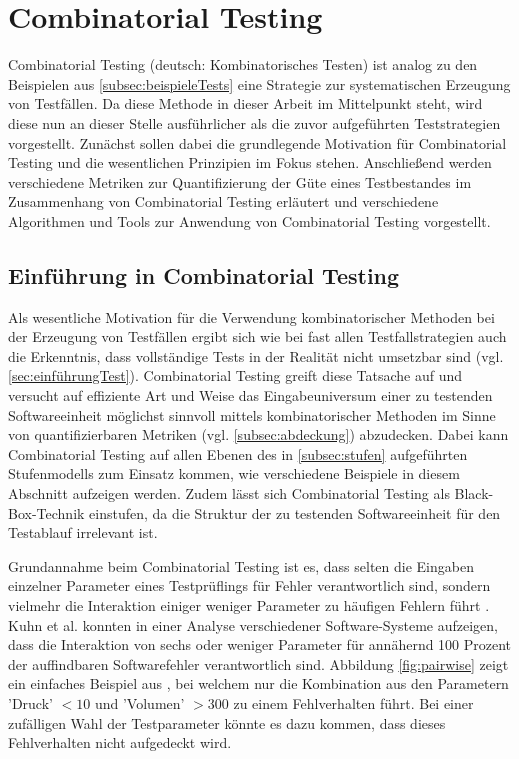 \section{Combinatorial Testing}\label{sec:combinatorialTesting}

Combinatorial Testing (deutsch: Kombinatorisches Testen) ist analog zu den Beispielen aus \autoref{subsec:beispieleTests} eine Strategie zur systematischen Erzeugung von Testfällen. Da diese Methode in dieser Arbeit im Mittelpunkt steht, wird diese nun an dieser Stelle ausführlicher als die zuvor aufgeführten Teststrategien vorgestellt. Zunächst sollen dabei die grundlegende Motivation für Combinatorial Testing und die wesentlichen Prinzipien im Fokus stehen. Anschließend werden verschiedene Metriken zur Quantifizierung der Güte eines Testbestandes im Zusammenhang von Combinatorial Testing erläutert und verschiedene Algorithmen und Tools zur Anwendung von Combinatorial Testing vorgestellt.

\subsection{Einführung in Combinatorial Testing}\label{subsec:einführungCombinatorial}

Als wesentliche Motivation für die Verwendung kombinatorischer Methoden bei der Erzeugung von Testfällen ergibt sich wie bei fast allen Testfallstrategien auch die Erkenntnis, dass vollständige Tests in der Realität nicht umsetzbar sind (vgl. \autoref{sec:einführungTest}). Combinatorial Testing greift diese Tatsache auf und versucht auf effiziente Art und Weise das Eingabeuniversum einer zu testenden Softwareeinheit möglichst sinnvoll mittels kombinatorischer Methoden im Sinne von quantifizierbaren Metriken (vgl. \autoref{subsec:abdeckung}) abzudecken. Dabei kann Combinatorial Testing auf allen Ebenen des in \autoref{subsec:stufen} aufgeführten Stufenmodells zum Einsatz kommen, wie verschiedene Beispiele in diesem Abschnitt aufzeigen werden. Zudem lässt sich Combinatorial Testing als Black-Box-Technik einstufen, da die Struktur der zu testenden Softwareeinheit für den Testablauf irrelevant ist.

Grundannahme beim Combinatorial Testing ist es, dass selten die Eingaben einzelner Parameter eines Testprüflings für Fehler verantwortlich sind, sondern vielmehr die Interaktion einiger weniger Parameter zu häufigen Fehlern führt \cite{kuhn2010practical}. Kuhn et al. \cite{kuhn2004error} konnten in einer Analyse verschiedener Software-Systeme aufzeigen, dass die Interaktion von sechs oder weniger Parameter für annähernd 100 Prozent der auffindbaren Softwarefehler verantwortlich sind. Abbildung \ref{fig:pairwise} zeigt ein einfaches Beispiel aus \cite{kuhn2010practical}, bei welchem nur die Kombination aus den Parametern 'Druck' $< 10$ und 'Volumen' $> 300$ zu einem Fehlverhalten führt. Bei einer zufälligen Wahl der Testparameter könnte es dazu kommen, dass dieses Fehlverhalten nicht aufgedeckt wird.

